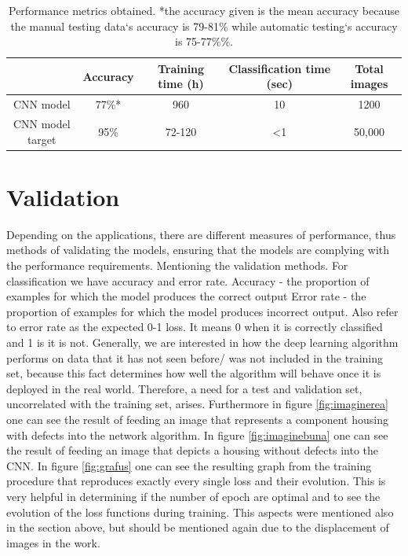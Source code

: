 \documentclass[12pt,a4paper,twoside]{report}
\begin{document}
\begin {table}[H]
\label{tab:performance}
\begin{center}
 \begin{tabular}{|c |c| c | c| c|} 
 \hline
  & Accuracy &  Training time (h) & Classification time (sec) & Total images\\ 
 \hline
 CNN model & 77\%* & 960 & 10 & 1200\\ 
 \hline
 CNN model target & 95\% & 72-120 & <1 &50,000 \\
 \hline
 \end{tabular}
\end{center}
\caption{Performance metrics obtained. *the accuracy given is the mean accuracy because the manual testing data`s accuracy is 79-81\% while automatic testing`s accuracy is 75-77\%\%.}
\end{table}


\section{Validation}
Depending on the applications, there are different measures of performance, thus methods of validating the models, ensuring that the models are complying with the performance requirements.
Mentioning the validation methods. For classification we have accuracy and error rate.
Accuracy - the proportion of examples for which the model produces the correct output
Error rate - the proportion of examples for which the model produces incorrect output. Also refer to error rate as the expected 0-1 loss. It means 0 when it is correctly classified and 1 is it is not. \cite{book-deeplearning}
Generally, we are interested in how the deep learning algorithm performs on data that it has not seen before/ was not included in the training set, because this fact determines how well the algorithm will behave once it is deployed in the real world. Therefore, a need for a test and validation set, uncorrelated with the training set, arises. Furthermore in figure \ref{fig:imaginerea} one can see the result of feeding an image that represents a component housing with defects into the network algorithm. In figure \ref{fig:imaginebuna} one can see the result of feeding an image that depicts a housing without defects into the CNN. In figure \ref{fig:grafus} one can see the resulting graph from the training procedure that reproduces exactly every single loss and their evolution. This is very helpful in determining if the number of epoch are optimal and to see the evolution of the loss functions during training. This aspects were mentioned also in the section above, but should be mentioned again due to the displacement of images in the work.
\end{document}

